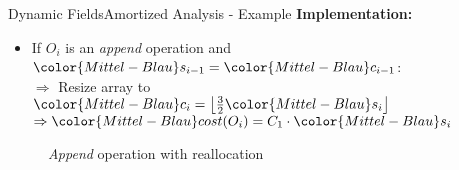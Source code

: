 \begin{frame}{Dynamic Fields}{Amortized Analysis - Example}
  \textbf{Implementation:}
  \begin{itemize}
    \item
      If {\color{Mittel-Blau}$O_i$} is an \textit{append} operation and
      ${\color{Mittel-Blau}s_{i-1}} = {\color{Mittel-Blau}c_{i-1}}$:\\
      $\Rightarrow$ Resize array to
      ${\color{Mittel-Blau}c_i}
        = \left\lfloor\frac{3}{2} {\color{Mittel-Blau}s_i} \right\rfloor$\\
      $\Rightarrow {\color{Mittel-Blau}cost(O_i)}
        = C_1 \cdot {\color{Mittel-Blau}s_i}$
  \end{itemize}
  \begin{figure}[!h]
    \def\FSAsize{7}\def\FSAelements{7}%
    \def\FSAcopy{0}\def\FSAdelete{0}\def\FSAinsert{0}%
    \def\FSAcopyarrow{0}%
    \def\FSAlabelsize{${\color{Mittel-Blau}s_{i-1}} = 7$}%
    \def\FSAlabelcapacity{%
      ${\color{Mittel-Blau}c_{i-1}}%
        = {\color{Mittel-Blau}s_{i-1}} = 7$}%
    \hspace*{0.5em}\raisebox{2em}{$\Rightarrow$}\hspace*{0.5em}%
    \def\FSAsize{13}\def\FSAelements{0}%
    \def\FSAcopy{8}\def\FSAdelete{0}\def\FSAinsert{1}%
    \def\FSAlabelsize{${\color{Mittel-Blau}s_i}
      = {\color{Mittel-Blau}s_{i-1}} + 1$}%
    \def\FSAlabelcapacity{${\color{Mittel-Blau}c_i}
      = \frac{3}{2}{\color{Mittel-Blau}s_i}$ = 13}%
    \caption{\textit{Append} operation with reallocation}
    \label{fig:dynamic_fields:amortized_analysis:append}
  \end{figure}
\end{frame}


